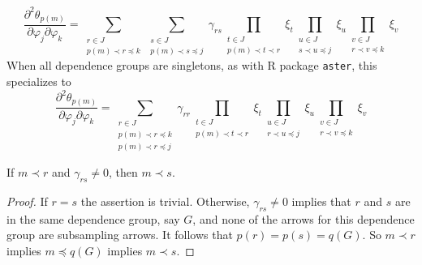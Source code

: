 \begin{lemma} \label{lem:kumquat}
\begin{equation} \label{eq:kumquat}
   \frac{\partial^2 \theta_{p(m)}}{\partial \varphi_j \partial \varphi_k}
   =
   \sum_{\substack{r \in J \\ p(m) \prec r \preceq k}}
   \sum_{\substack{s \in J \\ p(m) \prec s \preceq j}}
   \gamma_{r s}
   \prod_{\substack{t \in J \\ p(m) \prec t \prec r}} \xi_t
   \prod_{\substack{u \in J \\ s \prec u \preceq j}} \xi_u
   \prod_{\substack{v \in J \\ r \prec v \preceq k}} \xi_v
\end{equation}
When all dependence groups are singletons, as with R package {\tt aster},
this specializes to
\begin{equation} \label{eq:kumquat-no-groups}
   \frac{\partial^2 \theta_{p(m)}}{\partial \varphi_j \partial \varphi_k}
   =
   \sum_{\substack{r \in J \\ p(m) \prec r \preceq k \\ p(m) \prec r \preceq j}}
   \gamma_{r r}
   \prod_{\substack{t \in J \\ p(m) \prec t \prec r}} \xi_t
   \prod_{\substack{u \in J \\ r \prec u \preceq j}} \xi_u
   \prod_{\substack{v \in J \\ r \prec v \preceq k}} \xi_v
\end{equation}
\end{lemma}

\begin{lemma} \label{lem:quince}
If $m \prec r$ and $\gamma_{r s} \neq 0$, then $m \prec s$.
\end{lemma}
\begin{proof}
If $r = s$ the assertion is trivial.
Otherwise, $\gamma_{r s} \neq 0$ implies that $r$ and $s$ are in the
same dependence group, say $G$, and none of the arrows for this dependence
group are subsampling arrows.  It follows that $p(r) = p(s) = q(G)$.
So $m \prec r$ implies $m \preceq q(G)$ implies $m \prec s$.
\end{proof}

